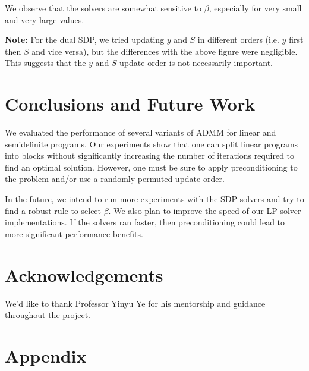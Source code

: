 \documentclass{article}
\begin{document}
We observe that the solvers are somewhat sensitive to $\beta$, especially for very small and very large values. 

\textbf{Note:} For the dual SDP, we tried updating $y$ and $S$ in different orders (i.e. $y$ first then $S$ and vice versa), but the differences with the above figure were negligible. This suggests that the $y$ and $S$ update order is not necessarily important.


\vspace{0.1in}
\section{Conclusions and Future Work}

We evaluated the performance of several variants of ADMM for linear and semidefinite programs. Our experiments show that one can split linear programs into blocks without significantly increasing the number of iterations required to find an optimal solution. However, one must be sure to apply preconditioning to the problem and/or use a randomly permuted update order. 

In the future, we intend to run more experiments with the SDP solvers and try to find a robust rule to select $\beta$. We also plan to improve the speed of our LP solver implementations. If the solvers ran faster, then preconditioning could lead to more significant performance benefits.

\section{Acknowledgements}

We'd like to thank Professor Yinyu Ye for his mentorship and guidance throughout the project. 

\section{Appendix}
\end{document}
